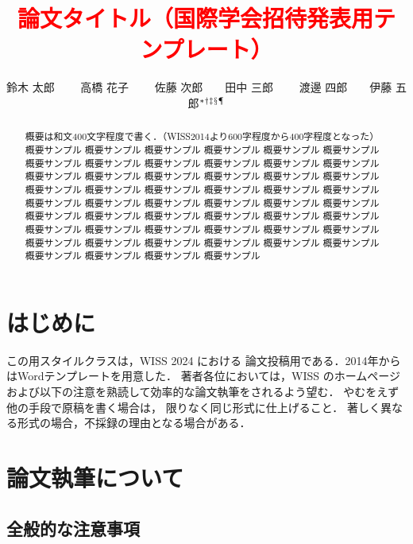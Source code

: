 \documentclass[twoside]{wiss}
\begin{document}
\title{\textcolor{red}{論文タイトル（国際学会招待発表用テンプレート）}}
\etitle{}%
%
%
%
\author{鈴木 太郎 　　高橋 花子
　　佐藤 次郎　　田中 三郎
　　渡邊 四郎　　伊藤 五郎${}^* {}^\dag {}^\ddag {}^\mathsection
{}^\mathparagraph$}

\begin{abstract}
概要は和文400文字程度で書く．（WISS2014より600字程度から400字程度となった）
概要サンプル 概要サンプル 概要サンプル 概要サンプル 概要サンプル 概要サンプル
概要サンプル 概要サンプル 概要サンプル 概要サンプル 概要サンプル 概要サンプル
概要サンプル 概要サンプル 概要サンプル 概要サンプル 概要サンプル 概要サンプル
概要サンプル 概要サンプル 概要サンプル 概要サンプル 概要サンプル 概要サンプル
概要サンプル 概要サンプル 概要サンプル 概要サンプル 概要サンプル 概要サンプル
概要サンプル 概要サンプル 概要サンプル 概要サンプル 概要サンプル 概要サンプル
概要サンプル 概要サンプル 概要サンプル 概要サンプル 概要サンプル 概要サンプル
概要サンプル 概要サンプル 概要サンプル 概要サンプル 概要サンプル 概要サンプル
概要サンプル 概要サンプル 概要サンプル 概要サンプル
\end{abstract}

\maketitle

\section{はじめに}

この\LaTeXe{}用スタイルクラスは，WISS 2024 における
論文投稿用である．2014年からはWordテンプレートを用意した．
著者各位においては，WISS のホームページ\cite{wiss}
および以下の注意を熟読して効率的な論文執筆をされるよう望む．
やむをえず他の手段で原稿を書く場合は，
限りなく同じ形式に仕上げること．
著しく異なる形式の場合，不採録の理由となる場合がある．

\section{論文執筆について}

\subsection{全般的な注意事項}
\end{document}
